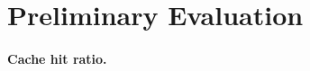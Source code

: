 \section{Preliminary Evaluation}
\label{sec:Evaluation}



\vspace{-6pt}
\paragraph{Cache hit ratio.}

